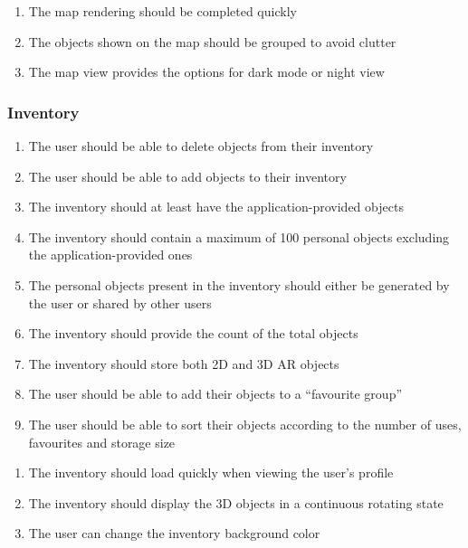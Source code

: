 \documentclass{article}
\begin{document}
\begin{enumerate}[align=left, label=\textbf{MP-NFR\arabic*:}]
    \item The map rendering should be completed quickly
    \item The objects shown on the map should be grouped to avoid clutter
    \item The map view provides the options for dark mode or night view
\end{enumerate}

\subsubsection{Inventory}
\label{ssub:inventory}

\begin{enumerate}[align=left, label=\textbf{IV-FR\arabic*:}]
    \item The user should be able to delete objects from their inventory
    \item The user should be able to add objects to their inventory
    \item The inventory should at least have the application-provided objects
    \item The inventory should contain a maximum of 100 personal objects excluding the application-provided ones
    \item The personal objects present in the inventory should either be generated by the user or shared by other users
    \item The inventory should provide the count of the total objects
    \item The inventory should store both 2D and 3D AR objects
    \item The user should be able to add their objects to a “favourite group”
    \item The user should be able to sort their objects according to the number of uses, favourites and storage size
\end{enumerate}

\begin{enumerate}[align=left, label=\textbf{IV-NFR\arabic*:}]
    \item The inventory should load quickly when viewing the user’s profile
    \item The inventory should display the 3D objects in a continuous rotating state
    \item The user can change the inventory background color
\end{enumerate}
\end{document}
